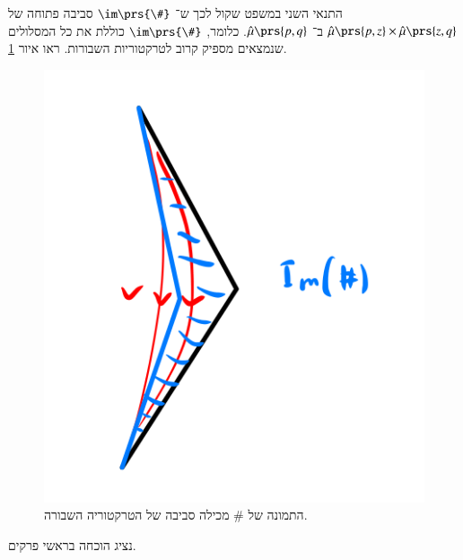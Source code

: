 \documentclass[a4paper,10pt,twoside,openany]{book}
\begin{document}
\begin{remark}
התנאי השני במשפט שקול לכך ש־%
$\im \prs{\#}$
סביבה פתוחה של
$\hat{\mu}\prs{p,z} \times \hat{\mu} \prs{z,q}$
ב־%
$\hat{\mu}\prs{p,q}$.
כלומר,
$\im\prs{\#}$
כוללת את כל המסלולים שנמצאים מספיק קרוב לטרקטוריות השבורות.
ראו איור
\ref{7.1}.
\end{remark}

\begin{figure}
\centering
\includegraphics[scale=0.5]{sources/7.1}
\caption{התמונה של
$\#$
מכילה סביבה של הטרקטוריה השבורה.}
\label{7.1}
\end{figure}

נציג הוכחה בראשי פרקים.
\end{document}
